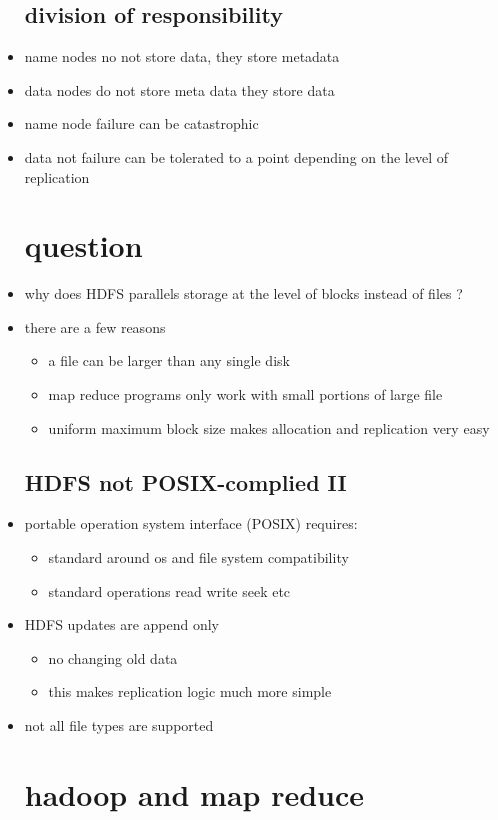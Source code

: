 \documentclass{article}
\begin{document}
\begin{itemize}
\subsection{division of responsibility}
\item name nodes no not store data, they store metadata 
\item data nodes do not store meta data they store data 
\item name node failure can be catastrophic 
\item data not failure can be tolerated to a point depending on the level of replication 
\section{question}
\item why does HDFS parallels storage at the level of blocks instead of files ?
\item there are a few reasons 
\begin{itemize}
    \item a file can be larger than any single disk
    \item map reduce programs only work with small portions of large file
    \item uniform maximum block size makes allocation and replication very easy
\end{itemize}
\subsection{HDFS not POSIX-complied II}
\item portable operation system interface (POSIX) requires:
\begin{itemize}
    \item standard around os and file system compatibility 
    \item standard operations read write seek etc
\end{itemize}
\item HDFS updates are append only 
\begin{itemize}
    \item no changing old data 
    \item this makes replication logic much more simple 
\end{itemize}
\item not all file types are supported
\section{hadoop and map reduce}

\end{itemize}
\end{document}
